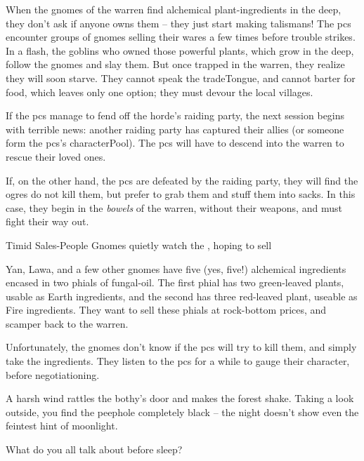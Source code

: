 
\label{gnomeWarrenPrelude}

\noindent
When the gnomes of the \gls{warren} find alchemical plant-\glspl{ingredient} in the \gls{deep}, they don't ask if anyone owns them -- they just start making \glspl{talisman}!
The \glspl{pc} encounter groups of gnomes selling their wares a few times before trouble strikes.
In a flash, the goblins who owned those powerful plants, which grow in the \gls{deep}, follow the gnomes and slay them.
But once trapped in the \gls{warren}, they realize they will soon starve.
They cannot speak the \gls{tradeTongue}, and cannot barter for food, which leaves only one option; they must devour the local \glspl{village}.

If the \glspl{pc} manage to fend off the horde's raiding party, the next session begins with terrible news: another raiding party has captured their allies (or someone form the \glspl{pc}'s \gls{characterPool}).
The \glspl{pc} will have to descend into the warren to rescue their loved ones.

If, on the other hand, the \glspl{pc} are defeated by the raiding party, they will find the \glspl{ogre} do not kill them, but prefer to grab them and stuff them into sacks.
In this case, they begin in the \textit{bowels} of the \gls{warren}, without their weapons, and must fight their way out.

{Timid Sales-People}%
{Gnomes quietly watch the , hoping to sell }%

\begin{exampletext}
		Yan, Lawa, and a few other gnomes have five (yes, five!) alchemical \glspl{ingredient} encased in two phials of fungal-oil.
		The first phial has two green-leaved plants, usable as Earth \glspl{ingredient}, and the second has three red-leaved plant, useable as Fire \glspl{ingredient}.
		They want to sell these phials at rock-bottom prices, and scamper back to the \gls{warren}.

		Unfortunately, the gnomes don't know if the \glspl{pc} will try to kill them, and simply take the \glspl{ingredient}.
		They listen to the \glspl{pc} for a while to gauge their character, before negotiationing.

\end{exampletext}


\begin{boxtext}
	A harsh wind rattles the \gls{bothy}'s door and makes the forest shake.
	Taking a look outside, you find the peephole completely black -- the night doesn't show even the feintest hint of moonlight.

	What do you all talk about before sleep?
\end{boxtext}


